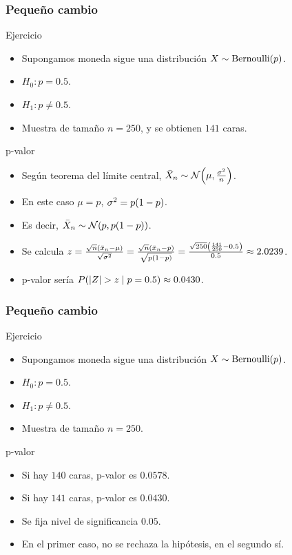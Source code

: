 \documentclass[table]{beamer}
\begin{document}
\begin{frame}
    \frametitle{Pequeño cambio}
    \begin{block}{Ejercicio}
        \begin{itemize}
            \item Supongamos moneda sigue una distribución $X \sim \bernoulli{p}$.
            \item $H_{0}: p = 0.5$.
            \item $H_{1}: p \neq 0.5$.
            \item Muestra de tamaño $n = 250$, y se obtienen $141$ caras.
        \end{itemize}
    \end{block}
    \begin{block}{p-valor}
        \begin{itemize}
            \item Según teorema del límite central, $\bar{X}_{n} \sim \normal{\mu}{\frac{\sigma^{2}}{n}}$.
            \item En este caso $\mu = p$, $\sigma^{2} = p \parens{1 - p}$.
            \item Es decir, $\bar{X}_{n} \sim \normal{p}{p \parens{1 - p}}$.
            \item Se calcula $z = \frac{\sqrt{n} \parens{\bar{x}_{n} - \mu}}{\sqrt{\sigma^{2}}} = \frac{\sqrt{n} \parens{\bar{x}_{n} - p}}{\sqrt{p \parens{1 - p}}} = \frac{\sqrt{250} \parens{\frac{141}{250} - 0.5}}{0.5} \approx 2.0239$.
            \item p-valor sería $\prob{\vparens{Z} > z \mid p = 0.5} \approx 0.0430$.
        \end{itemize}
    \end{block}
\end{frame}

\begin{frame}
    \frametitle{Pequeño cambio}
    \begin{block}{Ejercicio}
        \begin{itemize}
            \item Supongamos moneda sigue una distribución $X \sim \bernoulli{p}$.
            \item $H_{0}: p = 0.5$.
            \item $H_{1}: p \neq 0.5$.
            \item Muestra de tamaño $n = 250$.
        \end{itemize}
    \end{block}
    \begin{block}{p-valor}
        \begin{itemize}
            \item Si hay $140$ caras, p-valor es $0.0578$.
            \item Si hay $141$ caras, p-valor es $0.0430$.
            \item Se fija nivel de significancia $0.05$.
            \item En el primer caso, no se rechaza la hipótesis, en el segundo sí.
        \end{itemize}
    \end{block}
\end{frame}
\end{document}
